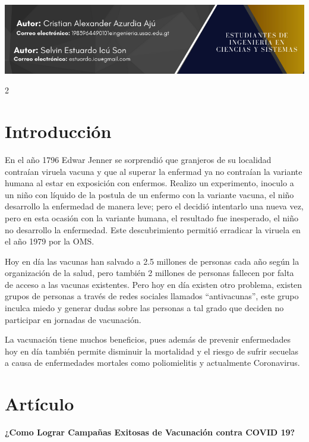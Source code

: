 \documentclass[12pt,spanish,Letterpaper,openany]{book}
\begin{document}
\begin{center}\includegraphics[width=1\linewidth]{images/pareja46_01} \end{center}

\begin {multicols}{2}

\hypertarget{introducciuxf3n}{%
\section{Introducción}\label{introducciuxf3n}}

En el año 1796 Edwar Jenner se sorprendió que granjeros de su localidad contraían viruela
vacuna y que al superar la enfermad ya no contraían la variante humana al estar en exposición
con enfermos. Realizo un experimento, inoculo a un niño con líquido de la postula de un
enfermo con la variante vacuna, el niño desarrollo la enfermedad de manera leve; pero el
decidió intentarlo una nueva vez, pero en esta ocasión con la variante humana, el resultado
fue inesperado, el niño no desarrollo la enfermedad. Este descubrimiento permitió erradicar
la viruela en el año 1979 por la OMS.

Hoy en día las vacunas han salvado a 2.5 millones de personas cada año según la organización
de la salud, pero también 2 millones de personas fallecen por falta de acceso a las vacunas
existentes. Pero hoy en día existen otro problema, existen grupos de personas a través de
redes sociales llamados ``antivacunas'', este grupo inculca miedo y generar dudas sobre las
personas a tal grado que deciden no participar en jornadas de vacunación.

La vacunación tiene muchos beneficios, pues además de prevenir enfermedades hoy en día
también permite disminuir la mortalidad y el riesgo de sufrir secuelas a causa de
enfermedades mortales como poliomielitis y actualmente Coronavirus.

\hypertarget{artuxedculo}{%
\section{Artículo}\label{artuxedculo}}

\textbf{¿Como Lograr Campañas Exitosas de Vacunación contra COVID 19?}


\end{multicols}
\end{document}
